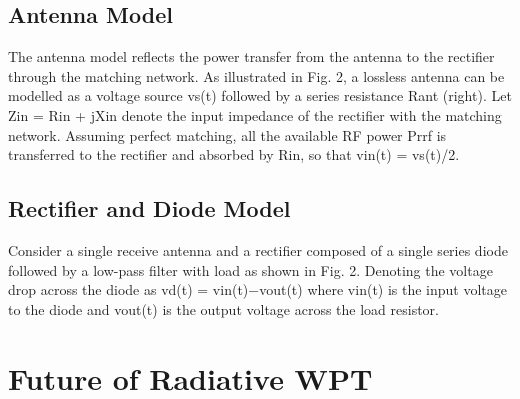 \documentclass[hidelinks, 12pt]{report}
\begin{document}
\begin{itemize}
\begin{itemize}
\begin{itemize}
\begin{itemize}
\begin{itemize}
\section{Antenna Model}
\justify
The antenna model reflects the power transfer from the antenna to the rectifier through the matching network. As illustrated in Fig. 2, a lossless antenna can be modelled as a voltage source vs(t) followed by a series resistance Rant (right). Let Zin = Rin + jXin denote the input impedance of the rectifier with the matching network. Assuming perfect matching, all the available RF power Prrf is transferred to the rectifier and absorbed by Rin, so that vin(t) = vs(t)/2. 
\section{Rectifier and Diode Model}
\justify
Consider a single receive antenna and a rectifier composed of a single series diode followed by a low-pass filter with load as shown in Fig. 2.  Denoting the voltage drop across the diode as vd(t) = vin(t)−vout(t) where vin(t) is the input voltage to the diode and vout(t) is the output voltage across the load resistor. 















\chapter{Future of Radiative WPT}
\justify



\end{itemize}
\end{itemize}
\end{itemize}
\end{itemize}
\end{itemize}
\end{document}
